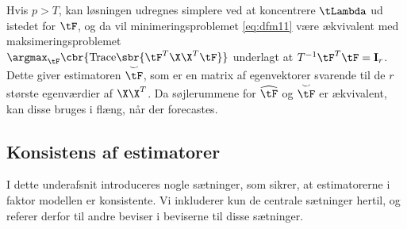 Hvis \(p > T\), kan løsningen udregnes simplere ved at koncentrere \(\tLambda\) ud istedet for \(\tF\), og da vil minimeringsproblemet \eqref{eq:dfm11} være ækvivalent med maksimeringsproblemet \\
\(\argmax_{\tF} \cbr{ \text{Trace} \sbr{ \tF^T \X \X^T \tF}}\) underlagt at \(T^{-1} \tF^T \tF = \mathbf{I}_r\).
Dette giver estimatoren \(\overset{\smile}{\tF}\), som er en matrix af egenvektorer svarende til de \(r\) største egenværdier af \(\X \X^T\).
Da søjlerummene for \(\widehat{\tF}\) og \(\overset{\smile}{\tF}\) er ækvivalent, kan disse bruges i flæng, når der forecastes.
%

\subsection{Konsistens af estimatorer}
I dette underafsnit introduceres nogle sætninger, som sikrer, at estimatorerne i faktor modellen er konsistente.
Vi inkluderer kun de centrale sætninger hertil, og referer derfor til andre beviser i beviserne til disse sætninger.

